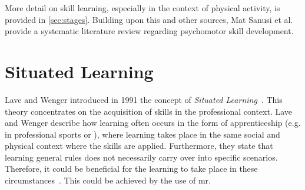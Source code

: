 More detail on skill learning, especially in the context of physical activity, is provided in \autoref{sec:stages}. Building upon this and other sources, Mat Sanusi et al. \cite{mat2025virtual} provide a systematic literature review regarding psychomotor skill development.

\section{Situated Learning \label{sec:situated}}
Lave and Wenger introduced in 1991 the concept of \emph{Situated Learning}~\cite{lave:wenger:1991}. This theory concentrates on the acquisition of skills in the professional context. Lave and Wenger describe how learning often occurs in the form of apprenticeship (e.g. in professional sports or ), where learning takes place in the same social and physical context where the skills are applied. Furthermore, they state that learning general rules does not necessarily carry over into specific scenarios. Therefore, it could be beneficial for the learning to take place in these circumstances~\cite[p. 34]{lave:wenger:1991}. This could be achieved by the use of \acrshort{mr}.